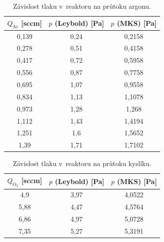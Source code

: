 \documentclass[12pt]{article}
\begin{document}
\begin{table}[htbp]
\begin{center}
\begin{tabular}{|c|c|c|}
\hline
$Q_\mathrm{Ar}$ [sccm] & $p$ (Leybold) [Pa] & $p$ (MKS) [Pa] \\ \hline
0,139 & 0,24 & 0,2158 \\ \hline
0,278 & 0,51 & 0,4158 \\ \hline
0,417 & 0,72 & 0,5958 \\ \hline
0,556 & 0,87 & 0,7758 \\ \hline
0,695 & 1,07 & 0,9558 \\ \hline
0,834 & 1,13 & 1,1078 \\ \hline
0,973 & 1,28 & 1,268 \\ \hline
1,112 & 1,43 & 1,4194 \\ \hline
1,251 & 1,6 & 1,5652 \\ \hline
1,39 & 1,71 & 1,7102 \\ \hline
\end{tabular}
\caption{Závislost tlaku v~reaktoru na průtoku argonu.}
\label{prutokargon}
\end{center}
\end{table}

\begin{table}[htbp]
\begin{center}
\begin{tabular}{|c|c|c|}
\hline
$Q_\mathrm{O_2}$ [sccm] & $p$ (Leybold) [Pa] & $p$ (MKS) [Pa] \\ \hline
4,9 & 3,97 & 4,0522 \\ \hline
5,88 & 4,47 & 4,5764 \\ \hline
6,86 & 4,97 & 5,0728 \\ \hline
7,35 & 5,27 & 5,3191 \\ \hline
\end{tabular}
\caption{Závislost tlaku v~reaktoru na průtoku kyslíku.}
\label{prutokkyslik}
\end{center}
\end{table}
\end{document}
